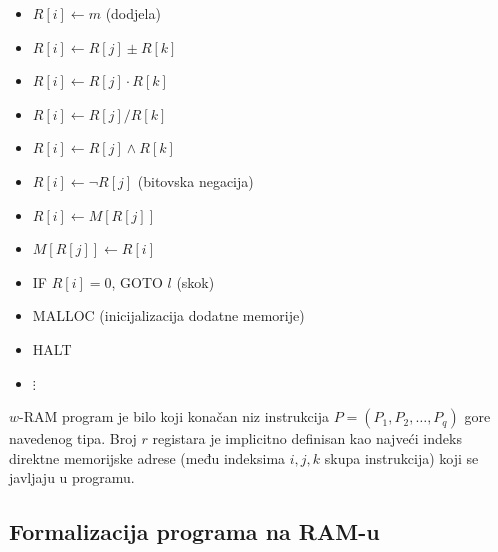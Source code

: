 \begin{itemize}
	\item $R[i] \gets m$ (dodjela)
	\item $R[i] \gets R[j] \pm R[k]$
	\item $R[i] \gets R[j] \cdot R[k] $
	\item $R[i] \gets R[j] / R[k] $
	\item $R[i] \gets R[j] \wedge R[k]$
	\item $R[i] \gets \neg R[j] $ (bitovska negacija)
	\item $R[i] \gets M[R[j]]$
	\item $M[R[j]] \gets R[i]$
	\item IF $R[i] = 0$, GOTO $l$ (skok)
	\item MALLOC (inicijalizacija dodatne memorije)
	\item HALT
	\item $\vdots$
\end{itemize}


\begin{definition}
   ${w}$-RAM program je bilo koji konačan niz instrukcija $P = (P_1, P_2,\ldots, P_q)$ gore navedenog tipa. Broj $r$ registara je implicitno definisan kao  najveći indeks direktne memorijske adrese (među indeksima $i, j, k$ skupa instrukcija) koji se javljaju u programu.
\end{definition}

\subsection{Formalizacija programa na RAM-u}

